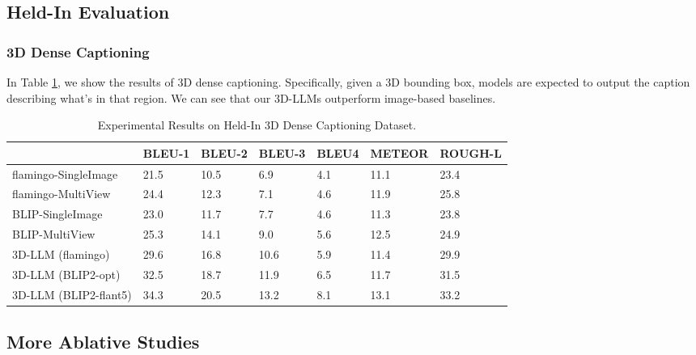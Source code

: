 \subsection{Held-In Evaluation}
\subsubsection{3D Dense Captioning}
In Table \ref{tab:dense}, we show the results of 3D dense captioning. Specifically, given a 3D bounding box, models are expected to output the caption describing what's in that region. We can see that our 3D-LLMs outperform image-based baselines. 
\begin{table}[!ht]
    \centering
    \small
    \begin{tabular}{lllllll}
    \hline
         ~ & BLEU-1 & BLEU-2 & BLEU-3 & BLEU4 & METEOR & ROUGH-L  \\ \hline
        flamingo-SingleImage & 21.5 & 10.5 & 6.9 & 4.1 &11.1 & 23.4\\
        flamingo-MultiView & 24.4 & 12.3 & 7.1 & 4.6 & 11.9 & 25.8\\
        BLIP-SingleImage & 23.0 & 11.7 & 7.7 & 4.6 & 11.3 & 23.8\\
        BLIP-MultiView & 25.3 & 14.1 & 9.0 & 5.6 & 12.5 & 24.9\\
        3D-LLM (flamingo) & 29.6 & 16.8 & 10.6 &  5.9 & 
        11.4 & 29.9 \\
        3D-LLM (BLIP2-opt) & 32.5 & 18.7 & 11.9 & 6.5 & 11.7 & 31.5 \\
        3D-LLM (BLIP2-flant5) & 34.3 & 20.5 & 13.2 & 8.1 & 13.1 & 33.2  \\ 
\hline
    \end{tabular}
\caption{Experimental Results on Held-In 3D Dense Captioning Dataset.}
    \label{tab:dense}
\end{table}




\subsection{More Ablative Studies}
